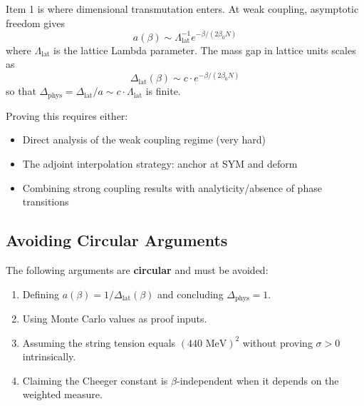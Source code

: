 \begin{remark}
Item 1 is where dimensional transmutation enters. At weak coupling, asymptotic freedom gives
\begin{equation}
    a(\beta) \sim \Lambda_{\text{lat}}^{-1} e^{-\beta/(2\beta_0 N)}
\end{equation}
where $\Lambda_{\text{lat}}$ is the lattice Lambda parameter. The mass gap in lattice units scales as
\begin{equation}
    \Delta_{\text{lat}}(\beta) \sim c \cdot e^{-\beta/(2\beta_0 N)}
\end{equation}
so that $\Delta_{\text{phys}} = \Delta_{\text{lat}} / a \sim c \cdot \Lambda_{\text{lat}}$ is finite.

Proving this requires either:
\begin{itemize}
    \item Direct analysis of the weak coupling regime (very hard)
    \item The adjoint interpolation strategy: anchor at SYM and deform
    \item Combining strong coupling results with analyticity/absence of phase transitions
\end{itemize}
\end{remark}

\subsection{Avoiding Circular Arguments}

\begin{caveat}
The following arguments are \textbf{circular} and must be avoided:
\begin{enumerate}
    \item Defining $a(\beta) = 1/\Delta_{\text{lat}}(\beta)$ and concluding $\Delta_{\text{phys}} = 1$.
    \item Using Monte Carlo values as proof inputs.
    \item Assuming the string tension equals $(440 \text{ MeV})^2$ without proving $\sigma > 0$ intrinsically.
    \item Claiming the Cheeger constant is $\beta$-independent when it depends on the weighted measure.
\end{enumerate}
\end{caveat}

